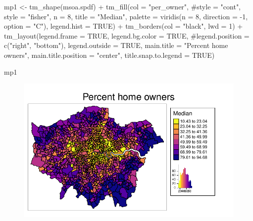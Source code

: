 \documentclass[
  letterpaper,
  DIV=11,
  numbers=noendperiod]{scrreprt}
\newenvironment{Shaded}{\begin{snugshade}}{\end{snugshade}}
\newcommand{\AttributeTok}[1]{\textcolor[rgb]{0.40,0.45,0.13}{#1}}
\newcommand{\CommentTok}[1]{\textcolor[rgb]{0.37,0.37,0.37}{#1}}
\newcommand{\ConstantTok}[1]{\textcolor[rgb]{0.56,0.35,0.01}{#1}}
\newcommand{\DecValTok}[1]{\textcolor[rgb]{0.68,0.00,0.00}{#1}}
\newcommand{\FunctionTok}[1]{\textcolor[rgb]{0.28,0.35,0.67}{#1}}
\newcommand{\NormalTok}[1]{\textcolor[rgb]{0.00,0.23,0.31}{#1}}
\newcommand{\OtherTok}[1]{\textcolor[rgb]{0.00,0.23,0.31}{#1}}
\newcommand{\SpecialCharTok}[1]{\textcolor[rgb]{0.37,0.37,0.37}{#1}}
\newcommand{\StringTok}[1]{\textcolor[rgb]{0.13,0.47,0.30}{#1}}
\begin{document}
\begin{Shaded}
\begin{Highlighting}[]
\NormalTok{mp1 }\OtherTok{\textless{}{-}} \FunctionTok{tm\_shape}\NormalTok{(msoa.spdf) }\SpecialCharTok{+}
  \FunctionTok{tm\_fill}\NormalTok{(}\AttributeTok{col =} \StringTok{"per\_owner"}\NormalTok{, }
          \CommentTok{\#style = "cont",}
          \AttributeTok{style =} \StringTok{"fisher"}\NormalTok{, }\AttributeTok{n =} \DecValTok{8}\NormalTok{,}
          \AttributeTok{title =} \StringTok{"Median"}\NormalTok{, }
          \AttributeTok{palette =} \FunctionTok{viridis}\NormalTok{(}\AttributeTok{n =} \DecValTok{8}\NormalTok{, }\AttributeTok{direction =} \SpecialCharTok{{-}}\DecValTok{1}\NormalTok{, }\AttributeTok{option =} \StringTok{"C"}\NormalTok{),}
          \AttributeTok{legend.hist =} \ConstantTok{TRUE}\NormalTok{) }\SpecialCharTok{+}
  \FunctionTok{tm\_borders}\NormalTok{(}\AttributeTok{col =} \StringTok{"black"}\NormalTok{, }\AttributeTok{lwd =} \DecValTok{1}\NormalTok{) }\SpecialCharTok{+}
  \FunctionTok{tm\_layout}\NormalTok{(}\AttributeTok{legend.frame =} \ConstantTok{TRUE}\NormalTok{, }\AttributeTok{legend.bg.color =} \ConstantTok{TRUE}\NormalTok{,}
            \CommentTok{\#legend.position = c("right", "bottom"),}
            \AttributeTok{legend.outside =} \ConstantTok{TRUE}\NormalTok{,}
            \AttributeTok{main.title =} \StringTok{"Percent home owners"}\NormalTok{, }
            \AttributeTok{main.title.position =} \StringTok{"center"}\NormalTok{,}
            \AttributeTok{title.snap.to.legend =} \ConstantTok{TRUE}\NormalTok{) }

\NormalTok{mp1 }
\end{Highlighting}
\end{Shaded}

\begin{figure}[H]

{\centering \includegraphics{04_dependence_files/figure-pdf/unnamed-chunk-4-1.pdf}

}

\end{figure}
\end{document}
